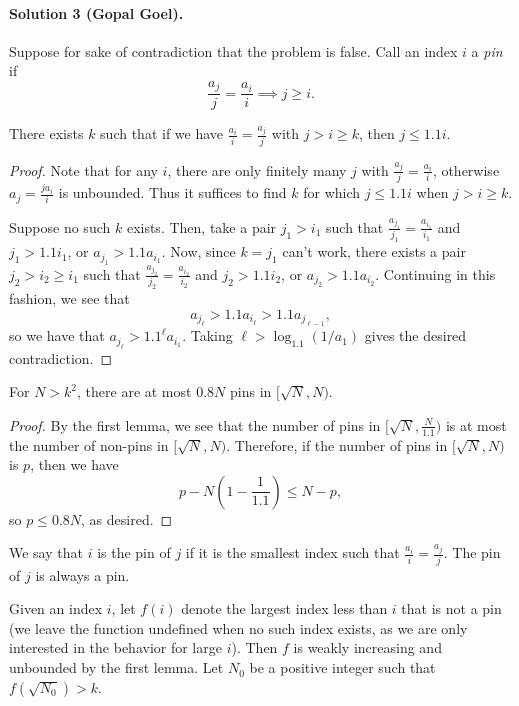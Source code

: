 \paragraph{Solution 3 (Gopal Goel).}

Suppose for sake of contradiction that the problem is false. Call an index $i$ a
\emph{pin} if
\[\frac{a_j}{j} = \frac{a_i}{i} \implies j\ge i.\]
\begin{lemma*}
There exists $k$ such that if we have $\tfrac{a_i}{i}=\tfrac{a_j}{j}$ with
$j > i \ge k$, then $j\le 1.1i$.
\end{lemma*}
\begin{proof}
  Note that for any $i$, there are only finitely many $j$ with
  $\frac{a_j}{j}=\frac{a_i}{i}$, otherwise $a_j=\frac{ja_i}{i}$ is unbounded.
  Thus it suffices to find $k$ for which $j\leq 1.1i$ when $j > i\geq k$.

  Suppose no such $k$ exists. Then, take a pair $j_1>i_1$ such that
  $\tfrac{a_{j_1}}{j_1} = \tfrac{a_{i_1}}{i_1}$ and $j_1>1.1i_1$, or
  $a_{j_1}>1.1a_{i_1}$. Now, since $k=j_1$ can't work, there exists a pair
  $j_2>i_2\ge i_1$ such that $\tfrac{a_{j_2}}{j_2} = \tfrac{a_{i_2}}{i_2}$ and
  $j_2>1.1i_2$, or $a_{j_2}>1.1a_{i_2}$. Continuing in this fashion, we see that
  \[a_{j_\ell}>1.1a_{i_\ell}> 1.1a_{j_{\ell-1}},\]
  so we have that $a_{j_\ell}>1.1^\ell a_{i_1}$. Taking $\ell>\log_{1.1}(1/a_1)$ gives the desired contradiction.
\end{proof}

\begin{lemma*}
For $N>k^2$, there are at most $0.8N$ pins in $[\sqrt{N},N)$.
\end{lemma*}
\begin{proof}
By the first lemma, we see that the number of pins in $[\sqrt{N},\tfrac{N}{1.1})$ is at most the number of non-pins in $[\sqrt{N},N)$. Therefore, if the number of pins in $[\sqrt{N},N)$ is $p$, then we have
\[p-N\left(1-\frac{1}{1.1}\right)\le N-p,\]
so $p\le 0.8N$, as desired.
\end{proof}
We say that $i$ is the pin of $j$ if it is the smallest index such that
$\tfrac{a_i}{i}=\tfrac{a_j}{j}$. The pin of $j$ is always a pin.

Given an index $i$, let $f(i)$ denote the largest index less than $i$ that is
not a pin (we leave the function undefined when no such index exists, as we are
only interested in the behavior for large $i$). Then $f$ is weakly increasing
and unbounded by the first lemma. Let $N_0$ be a positive integer such that
$f(\sqrt{N_0}) > k$.

